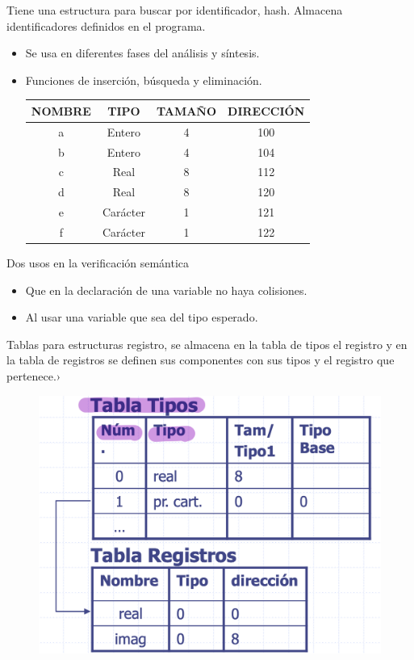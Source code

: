 \documentclass[12pt, twoside, openright]{report} %
\begin{document}
Tiene una estructura para buscar por identificador, hash. Almacena identificadores definidos en el programa.
\begin{itemize}
  \item Se usa en diferentes fases del análisis y síntesis.
  \item Funciones de inserción, búsqueda y eliminación.

\begin{table}[h]
    \begin{tabular}{|c|c|c|c|}
    \hline
    \textbf{NOMBRE} & \textbf{TIPO} & \textbf{TAMAÑO} & \textbf{DIRECCIÓN} \\ \hline
    a               & Entero        & 4               & 100                \\ \hline
    b               & Entero        & 4               & 104                \\ \hline
    c               & Real          & 8               & 112                \\ \hline
    d               & Real          & 8               & 120                \\ \hline
    e               & Carácter      & 1               & 121                \\ \hline
    f               & Carácter      & 1               & 122                \\ \hline
    \end{tabular}
\end{table}
\end{itemize}
\pagebreak
Dos usos en la verificación semántica
\begin{itemize}
  \item Que en la declaración de una variable no haya colisiones.
  \item Al usar una variable que sea del tipo esperado.
\end{itemize}

Tablas para estructuras registro, se almacena en la tabla de tipos el registro y en la tabla de registros se definen sus componentes con sus tipos y el registro que pertenece.›
\begin{figure}[H]
  {\includegraphics[scale=.4]{Screenshot 2021-06-09 at 12.38.46.png}}
\end{figure}
\end{document}
